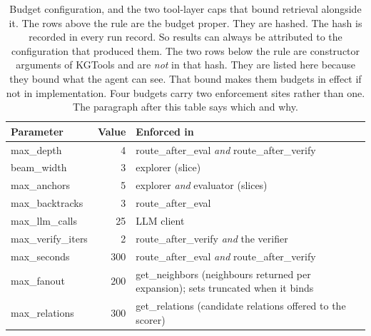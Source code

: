 \begin{table}[!tb]
  \begin{center}
    \caption[Budget configuration and the two tool-layer caps]{Budget
    configuration, and the two tool-layer caps that bound retrieval alongside
    it. The rows above the rule are the budget proper. They are hashed. The hash
    is recorded in every run record. So results can always be attributed to the
    configuration that produced them. The two rows below the rule are
    constructor arguments of \textsf{KGTools} and are \emph{not} in that hash.
    They are listed here because they bound what the agent can see. That bound
    makes them budgets in effect if not in implementation. Four budgets carry
    two enforcement sites rather than one. The paragraph after this table says
    which and why.}
    \label{tab:budget}
    \begin{tabular}{|l|r|L{58mm}|}
      \hline
      \textbf{Parameter} & \textbf{Value} & \textbf{Enforced in} \\
      \hline
      \textsf{max\_depth} & 4 & \textsf{route\_after\_eval} \emph{and}
      \textsf{route\_after\_verify} \\
      \textsf{beam\_width} & 3 & explorer (slice) \\
      \textsf{max\_anchors} & 5 & explorer \emph{and} evaluator (slices) \\
      \textsf{max\_backtracks} & 3 & \textsf{route\_after\_eval} \\
      \textsf{max\_llm\_calls} & 25 & LLM client \\
      \textsf{max\_verify\_iters} & 2 & \textsf{route\_after\_verify} \emph{and}
      the verifier \\
      \textsf{max\_seconds} & 300 & \textsf{route\_after\_eval} \emph{and}
      \textsf{route\_after\_verify} \\
      \hline
      \textsf{max\_fanout} & 200 & \textsf{get\_neighbors} (neighbours returned
      per expansion); sets \textsf{truncated} when it binds \\
      \textsf{max\_relations} & 300 & \textsf{get\_relations} (candidate
      relations offered to the scorer) \\
      \hline
    \end{tabular}
  \end{center}
\end{table}

